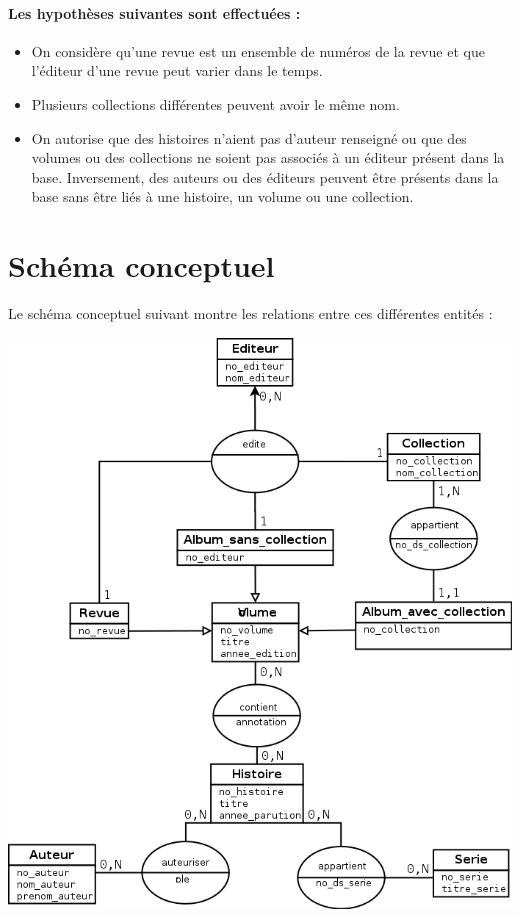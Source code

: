 \documentclass[12pt]{article}
\begin{document}
\paragraph{Les hypothèses suivantes sont effectuées :}
\begin{itemize}
	\item On considère qu'une revue est un ensemble de numéros de la revue et que l'éditeur d'une revue peut varier dans le temps.
	\item Plusieurs collections différentes peuvent avoir le même nom.
	\item On autorise que des histoires n'aient pas d'auteur renseigné ou que
		des volumes ou des collections ne soient pas associés à un éditeur
		présent dans la base. Inversement, des auteurs ou des éditeurs peuvent
		être présents dans la base sans être liés à une histoire, un volume ou
		une collection.
\end{itemize}


\section{Schéma conceptuel}

Le schéma conceptuel suivant montre les relations entre ces
différentes entités :

\noindent\includegraphics[width=\textwidth]{schema-conceptuel}
\end{document}
